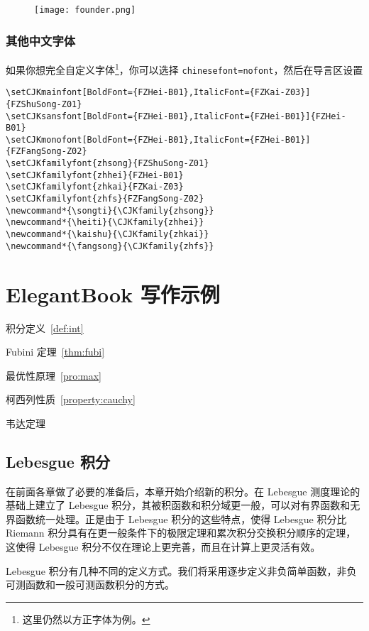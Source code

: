 \documentclass[cn,11pt]{elegantbook}
\begin{document}
\begin{figure}[!htb]
\centering
\texttt{[image: founder.png]}
\end{figure}

\subsection{其他中文字体}
如果你想完全自定义字体\footnote{这里仍然以方正字体为例。}，你可以选择 \lstinline{chinesefont=nofont}，然后在导言区设置
\begin{lstlisting}
\setCJKmainfont[BoldFont={FZHei-B01},ItalicFont={FZKai-Z03}]{FZShuSong-Z01}
\setCJKsansfont[BoldFont={FZHei-B01},ItalicFont={FZHei-B01}]{FZHei-B01}
\setCJKmonofont[BoldFont={FZHei-B01},ItalicFont={FZHei-B01}]{FZFangSong-Z02}
\setCJKfamilyfont{zhsong}{FZShuSong-Z01}
\setCJKfamilyfont{zhhei}{FZHei-B01}
\setCJKfamilyfont{zhkai}{FZKai-Z03}
\setCJKfamilyfont{zhfs}{FZFangSong-Z02}
\newcommand*{\songti}{\CJKfamily{zhsong}}
\newcommand*{\heiti}{\CJKfamily{zhhei}}
\newcommand*{\kaishu}{\CJKfamily{zhkai}}
\newcommand*{\fangsong}{\CJKfamily{zhfs}}
\end{lstlisting}

\chapter{ElegantBook 写作示例}

\begin{introduction}
  \item 积分定义~\ref{def:int}
  \item Fubini 定理~\ref{thm:fubi}
  \item 最优性原理~\ref{pro:max}
  \item 柯西列性质~\ref{property:cauchy}
  \item 韦达定理
\end{introduction}

\section{Lebesgue 积分}
在前面各章做了必要的准备后，本章开始介绍新的积分。在 Lebesgue 测度理论的基础上建立了 Lebesgue 积分，其被积函数和积分域更一般，可以对有界函数和无界函数统一处理。正是由于 Lebesgue 积分的这些特点，使得 Lebesgue 积分比 Riemann 积分具有在更一般条件下的极限定理和累次积分交换积分顺序的定理，这使得 Lebesgue 积分不仅在理论上更完善，而且在计算上更灵活有效。

Lebesgue 积分有几种不同的定义方式。我们将采用逐步定义非负简单函数，非负可测函数和一般可测函数积分的方式。
\end{document}
